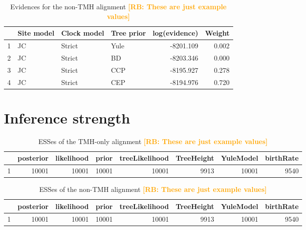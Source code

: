 \documentclass{article}
\newcommand{\richel}[1]{\textcolor{orange}{\textbf{[RB: #1]}}}
\begin{document}
\begin{table}[ht]
\centering
\begin{tabular}{rlllrr}
  \hline
 & Site model & Clock model & Tree prior & log(evidence) & Weight \\ 
  \hline
1 & JC & Strict & Yule & -8201.109 & 0.002 \\ 
  2 & JC & Strict & BD & -8203.346 & 0.000 \\ 
  3 & JC & Strict & CCP & -8195.927 & 0.278 \\ 
  4 & JC & Strict & CEP & -8194.976 & 0.720 \\ 
   \hline
\end{tabular}
\caption{
  Evidences for the non-TMH alignment
  \richel{These are just example values}
} 
\label{tab:evidences_non_tmh}
\end{table}

\section{Inference strength}

\begin{table}[ht]
\centering
\begin{tabular}{rrrrrrrr}
  \hline
 & posterior & likelihood & prior & treeLikelihood & TreeHeight & YuleModel & 
birthRate \\ 
  \hline
1 & 10001 & 10001 & 10001 & 10001 & 9913 & 10001 & 9540 \\ 
   \hline
\end{tabular}
\caption{
  ESSes of the TMH-only alignment
  \richel{These are just example values}
} 
\label{tab:esses_tmh}
\end{table}

\begin{table}[ht]
\centering
\begin{tabular}{rrrrrrrr}
  \hline
 & posterior & likelihood & prior & treeLikelihood & TreeHeight & YuleModel & 
birthRate \\ 
  \hline
1 & 10001 & 10001 & 10001 & 10001 & 9913 & 10001 & 9540 \\ 
   \hline
\end{tabular}
\caption{
  ESSes of the non-TMH alignment
  \richel{These are just example values}
} 
\label{tab:esses_non_tmh}
\end{table}
\end{document}
